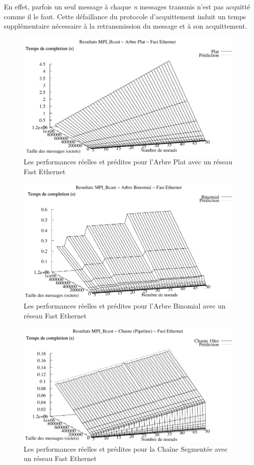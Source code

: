 En effet, parfois un seul message
à chaque \emph{n} messages transmis n'est pas acquitté comme il le
faut. Cette défaillance du protocole d'acquittement induit un temps supplémentaire
nécessaire à la retransmission du message et à son acquittement.  

%
\begin{figure}[h]
	\centering
		\includegraphics[width=0.6\linewidth]{images/modeles/FEth/Bcast/comp_Flat}
		
	\caption{\label{Figure:Comparison-Bcast_Flat_FEth}Les performances réelles
		et prédites pour l'Arbre Plat avec un réseau Fast Ethernet}
	
\end{figure}


%
\begin{figure}[h]
	\centering
		\includegraphics[width=0.6\linewidth]{images/modeles/FEth/Bcast/comp_Binomial}
	
	\caption{\label{Figure:Comparison-Bcast_Bin_FEth}Les performances réelles
		et prédites pour l'Arbre Binomial avec un réseau Fast Ethernet}
	
\end{figure}


%
\begin{figure}[h]
	\centering
		\includegraphics[width=0.6\linewidth]{images/modeles/FEth/Bcast/comp_Chain_16384}
	
	\caption{\label{Figure:Comparison-Bcast-Chain_FEth}Les performances réelles
		et prédites pour la Chaîne Segmentée avec un réseau Fast Ethernet}
	
\end{figure}

